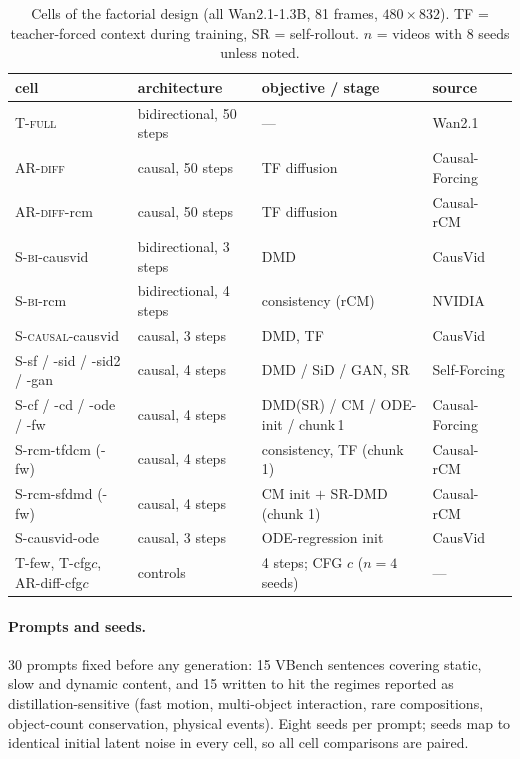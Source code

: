 \documentclass[10pt,twocolumn,letterpaper]{article}
\newcommand{\Tfull}{\textsc{T-full}}\newcommand{\ARdiff}{\textsc{AR-diff}}
\newcommand{\Sbi}{\textsc{S-bi}}\newcommand{\Scausal}{\textsc{S-causal}}
\begin{document}
\begin{table}[t]\centering\small
\caption{Cells of the factorial design (all Wan2.1-1.3B, 81 frames, $480{\times}832$). TF = teacher-forced context during training, SR = self-rollout. $n$ = videos with 8 seeds unless noted.}\label{tab:cells}
\begin{tabular}{@{}llll@{}}\toprule
cell & architecture & objective / stage & source \\\midrule
\Tfull & bidirectional, 50 steps & --- & Wan2.1 \\
\ARdiff & causal, 50 steps & TF diffusion & Causal-Forcing \\
\ARdiff-rcm & causal, 50 steps & TF diffusion & Causal-rCM \\
\Sbi-causvid & bidirectional, 3 steps & DMD & CausVid \\
\Sbi-rcm & bidirectional, 4 steps & consistency (rCM) & NVIDIA \\
\Scausal-causvid & causal, 3 steps & DMD, TF & CausVid \\
S-sf / -sid / -sid2 / -gan & causal, 4 steps & DMD / SiD / GAN, SR & Self-Forcing \\
S-cf / -cd / -ode / -fw & causal, 4 steps & DMD(SR) / CM / ODE-init / chunk\,1 & Causal-Forcing \\
S-rcm-tfdcm (-fw) & causal, 4 steps & consistency, TF (chunk 1) & Causal-rCM \\
S-rcm-sfdmd (-fw) & causal, 4 steps & CM init $+$ SR-DMD (chunk 1) & Causal-rCM \\
S-causvid-ode & causal, 3 steps & ODE-regression init & CausVid \\
T-few, T-cfg$c$, AR-diff-cfg$c$ & controls & 4 steps; CFG $c$ ($n{=}4$ seeds) & --- \\\bottomrule
\end{tabular}
\end{table}

\paragraph{Prompts and seeds.} 30 prompts fixed before any generation: 15 VBench sentences covering static, slow and dynamic content, and 15 written to hit the regimes reported as distillation-sensitive (fast motion, multi-object interaction, rare compositions, object-count conservation, physical events). Eight seeds per prompt; seeds map to identical initial latent noise in every cell, so all cell comparisons are paired.
\end{document}
